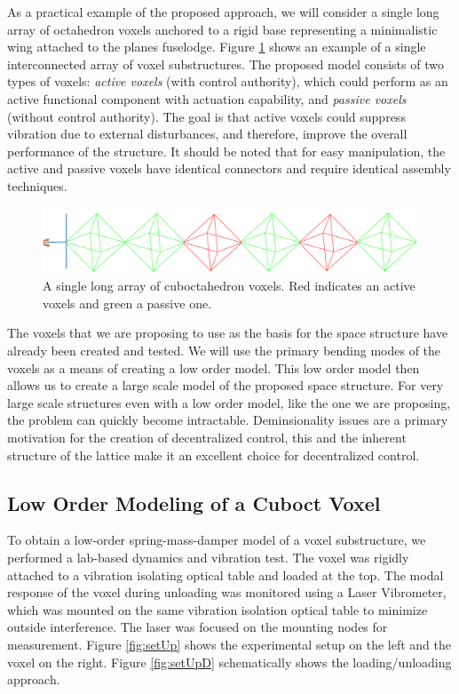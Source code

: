 \documentclass[11pt]{ucthesis}
\begin{document}
As a practical example of the proposed approach, we will consider a single long array of octahedron voxels anchored to a rigid base representing a minimalistic wing attached to the planes fuselodge. Figure \ref{fig:interconnected} shows an example of a single interconnected array of voxel substructures. The proposed model consists of two types of voxels: {\it active voxels} (with control authority), which could perform as an active functional component with actuation capability,  and {\it passive voxels} (without control authority). The goal is that active voxels could suppress vibration due to external disturbances, and therefore, improve the overall performance of the structure. It should be noted that for easy manipulation, the active and passive voxels have identical connectors and require identical assembly techniques.  

\begin{figure}[thpb]
\centering
\includegraphics[width=0.75\linewidth]{Figures/exampleInterconnectedStructure.png}
\caption{A single long array of cuboctahedron voxels. Red indicates an active voxels and green a passive one.}
\label{fig:interconnected}
\end{figure}

The voxels that we are proposing to use as the basis for the space structure have already been created and tested.\cite{jenett2016meso} We will use the primary bending modes of the voxels as a means of creating a low order model. This low order model then allows us to create a large scale model of the proposed space structure. For very large scale structures even with a low order model, like the one we are proposing, the problem can quickly become intractable. Deminsionality issues are a primary motivation for the creation of decentralized control\cite{bakule2008decentralized}, this and the inherent structure of the lattice make it an excellent choice for decentralized control.

\subsection{Low Order Modeling of a Cuboct Voxel}
\label{sec:model}
To obtain a low-order spring-mass-damper model of a voxel substructure, we performed a lab-based dynamics and vibration test. The voxel was rigidly attached to a vibration isolating optical table and loaded at the top. The modal response of the voxel during unloading was monitored using a Laser Vibrometer, which was mounted on the same vibration isolation optical table to minimize outside interference. The laser was focused on the mounting nodes for measurement. Figure \ref{fig:setUp} shows the experimental setup on the left and the voxel on the right. Figure \ref{fig:setUpD} schematically shows the loading/unloading approach.
\end{document}
